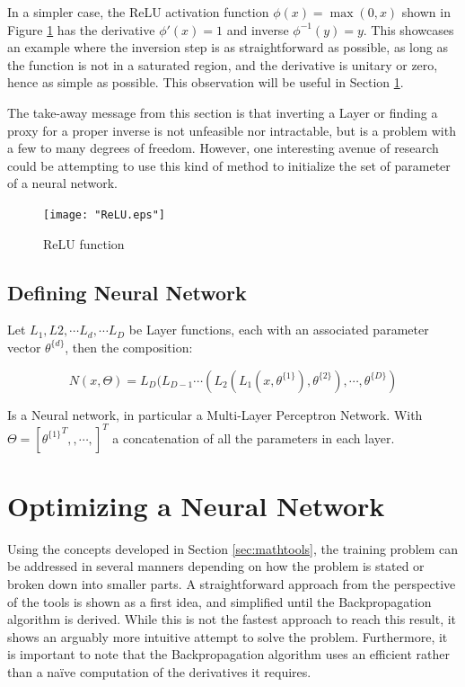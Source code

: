 \documentclass[10pt,journal,compsoc]{IEEEtran}
\newcommand{\cf}[1]{Figure \ref{#1}}
\newcommand{\cs}[1]{Section \ref{#1}}
\begin{document}
In a simpler case, the ReLU activation function $\phi(x) = \max(0,x)$ shown in \cf{fig:relu} has the derivative $\phi'(x) = 1$ and inverse $\phi^{-1}(y) = y$. This showcases an example where the inversion step is as straightforward as possible, as long as the function is not in a saturated region, and the derivative is unitary or zero, hence as simple as possible. This observation will be useful in \cs{sec:optimizing}.

The take-away message from this section is that inverting a Layer or finding a proxy for a proper inverse is not unfeasible nor intractable, but is a problem with a few to many degrees of freedom. However, one interesting avenue of research could be attempting to use this kind of method to initialize the set of parameter of a neural network.

\begin{figure}[h!]
	\centering
	\texttt{[image: "ReLU.eps"]}
	\caption{ReLU function}
	\label{fig:relu}
\end{figure}

\subsection{Defining Neural Network}

Let $L_1, L2, \cdots L_d, \cdots L_D$ be Layer functions, each with an associated parameter vector $\theta^{\{ d \} }$, then the composition:

\begin{equation}
	N(x, \Theta) = L_D ( L_{D-1}\cdots (L_2(L_1(x, \theta^{\{ 1 \}}), \theta^{\{ 2 \}}), \cdots, \theta^{\{ D \} } )
\end{equation}

Is a Neural network, in particular a Multi-Layer Perceptron Network. With $\Theta = [ {\theta^{\{ 1 \}}}^T, , \cdots,  ]^T$ a concatenation of all the parameters in each layer.

\section{Optimizing a Neural Network}\label{sec:optimizing}
 Using the concepts developed in \cs{sec:mathtools}, the training problem can be addressed in several manners depending on how the problem is stated or broken down into smaller parts. A straightforward approach from the perspective of the tools is shown as a first idea, and simplified until the Backpropagation algorithm is derived. While this is not the fastest approach to reach this result, it shows an arguably more intuitive attempt to solve the problem. Furthermore, it is important to note that the Backpropagation algorithm uses an efficient rather than a naïve computation of the derivatives it requires.
 
\end{document}
